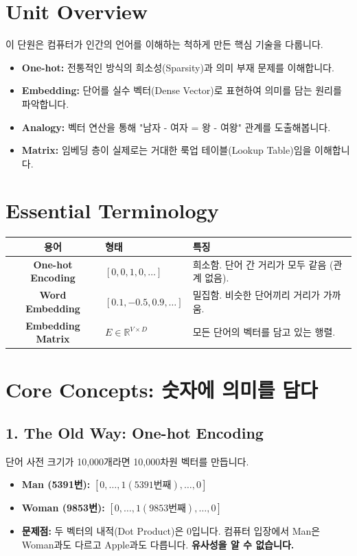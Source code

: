 \documentclass[11pt,a4paper]{book}
\theoremstyle{definition}
\begin{document}
\section{Unit Overview}
\begin{summarybox}[title={핵심 목표}]
이 단원은 컴퓨터가 인간의 언어를 이해하는 척하게 만든 핵심 기술을 다룹니다.
\begin{itemize}
    \item \textbf{One-hot:} 전통적인 방식의 희소성(Sparsity)과 의미 부재 문제를 이해합니다.
    \item \textbf{Embedding:} 단어를 실수 벡터(Dense Vector)로 표현하여 의미를 담는 원리를 파악합니다.
    \item \textbf{Analogy:} 벡터 연산을 통해 "남자 - 여자 = 왕 - 여왕" 관계를 도출해봅니다.
    \item \textbf{Matrix:} 임베딩 층이 실제로는 거대한 룩업 테이블(Lookup Table)임을 이해합니다.
\end{itemize}
\end{summarybox}

\section{Essential Terminology}
\begin{center}
\begin{tabular}{|c|l|l|}
\hline
\textbf{용어} & \textbf{형태} & \textbf{특징} \\ \hline
\textbf{One-hot Encoding} & $[0, 0, 1, 0, \dots]$ & 희소함. 단어 간 거리가 모두 같음 (관계 없음). \\ \hline
\textbf{Word Embedding} & $[0.1, -0.5, 0.9, \dots]$ & 밀집함. 비슷한 단어끼리 거리가 가까움. \\ \hline
\textbf{Embedding Matrix} & $E \in \mathbb{R}^{V \times D}$ & 모든 단어의 벡터를 담고 있는 행렬. \\ \hline
\end{tabular}
\end{center}

\section{Core Concepts: 숫자에 의미를 담다}

\subsection{1. The Old Way: One-hot Encoding}
단어 사전 크기가 10,000개라면 10,000차원 벡터를 만듭니다.
\begin{itemize}
    \item \textbf{Man (5391번):} $[0, \dots, 1(\text{5391번째}), \dots, 0]$
    \item \textbf{Woman (9853번):} $[0, \dots, 1(\text{9853번째}), \dots, 0]$
    \item \textbf{문제점:} 두 벡터의 내적(Dot Product)은 0입니다. 컴퓨터 입장에서 Man은 Woman과도 다르고 Apple과도 다릅니다. \textbf{유사성을 알 수 없습니다.}
\end{itemize}
\end{document}
